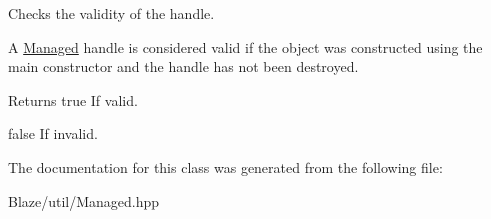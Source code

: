 Checks the validity of the handle. 

A \hyperlink{classblaze_1_1util_1_1Managed}{Managed} handle is considered valid if the object was constructed using the main constructor and the handle has not been destroyed.

\begin{DoxyReturn}{Returns}
true If valid. 

false If invalid. 
\end{DoxyReturn}


The documentation for this class was generated from the following file\+:\begin{DoxyCompactItemize}
\item 
Blaze/util/Managed.\+hpp\end{DoxyCompactItemize}
